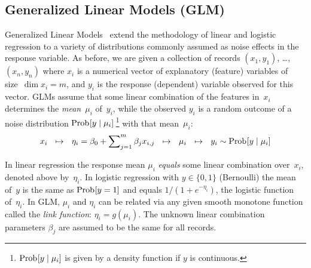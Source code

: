 \begin{comment}

 Licensed to the Apache Software Foundation (ASF) under one
 or more contributor license agreements.  See the NOTICE file
 distributed with this work for additional information
 regarding copyright ownership.  The ASF licenses this file
 to you under the Apache License, Version 2.0 (the
 "License"); you may not use this file except in compliance
 with the License.  You may obtain a copy of the License at

   http://www.apache.org/licenses/LICENSE-2.0

 Unless required by applicable law or agreed to in writing,
 software distributed under the License is distributed on an
 "AS IS" BASIS, WITHOUT WARRANTIES OR CONDITIONS OF ANY
 KIND, either express or implied.  See the License for the
 specific language governing permissions and limitations
 under the License.

\end{comment}

\subsection{Generalized Linear Models (GLM)}
\label{sec:GLM}

\smallskip

Generalized Linear Models~\cite{Gill2000:GLM,McCullagh1989:GLM,Nelder1972:GLM}
extend the methodology of linear and logistic regression to a variety of
distributions commonly assumed as noise effects in the response variable.
As before, we are given a collection
of records $(x_1, y_1)$, \ldots, $(x_n, y_n)$ where $x_i$ is a numerical vector of
explanatory (feature) variables of size~\mbox{$\dim x_i = m$}, and $y_i$ is the
response (dependent) variable observed for this vector.  GLMs assume that some
linear combination of the features in~$x_i$ determines the \emph{mean}~$\mu_i$
of~$y_i$, while the observed $y_i$ is a random outcome of a noise distribution
$\mathop{\mathrm{Prob}\hspace{0.5pt}}\nolimits[y\mid \mu_i]\,$\footnote{$\mathop{\mathrm{Prob}\hspace{0.5pt}}\nolimits[y\mid \mu_i]$ is given by a density function
if $y$ is continuous.}
with that mean~$\mu_i$:
\begin{equation*}
x_i \,\,\,\,\mapsto\,\,\,\, \eta_i = \beta_0 + \sum\nolimits_{j=1}^m \beta_j x_{i,j} 
\,\,\,\,\mapsto\,\,\,\, \mu_i \,\,\,\,\mapsto \,\,\,\, y_i \sim \mathop{\mathrm{Prob}\hspace{0.5pt}}\nolimits[y\mid \mu_i]
\end{equation*}

In linear regression the response mean $\mu_i$ \emph{equals} some linear combination
over~$x_i$, denoted above by~$\eta_i$.
In logistic regression with $y\in\{0, 1\}$ (Bernoulli) the mean of~$y$ is the same
as $\mathop{\mathrm{Prob}\hspace{0.5pt}}\nolimits[y=1]$ and equals $1/(1+e^{-\eta_i})$, the logistic function of~$\eta_i$.
In GLM, $\mu_i$ and $\eta_i$ can be related via any given smooth monotone function
called the \emph{link function}: $\eta_i = g(\mu_i)$.  The unknown linear combination
parameters $\beta_j$ are assumed to be the same for all records.

